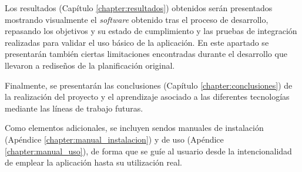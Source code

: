 Los resultados (Capítulo \ref{chapter:resultados}) obtenidos serán presentados mostrando visualmente el \textit{software} obtenido tras el proceso de desarrollo, 
repasando los objetivos y su estado de cumplimiento y las pruebas de integración realizadas para validar el uso básico de la aplicación.
En este apartado se presentarán también ciertas limitaciones encontradas durante el desarrollo que llevaron a rediseños de la planificación 
original.

Finalmente, se presentarán las conclusiones (Capítulo \ref{chapter:conclusiones}) de la realización del proyecto y el aprendizaje asociado a las diferentes tecnologías mediante las 
líneas de trabajo futuras.

Como elementos adicionales, se incluyen sendos manuales de instalación (Apéndice \ref{chapter:manual_instalacion}) y de uso (Apéndice \ref{chapter:manual_uso}), 
de forma que se guíe al usuario desde la intencionalidad 
de emplear la aplicación hasta su utilización real.

